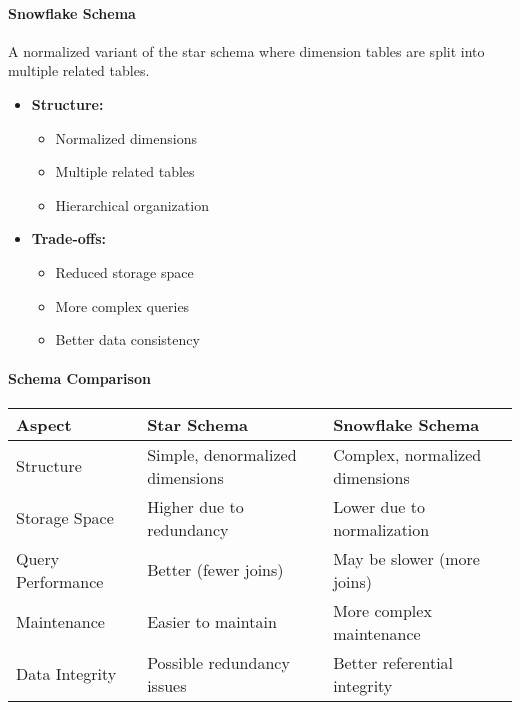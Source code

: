 \documentclass[a4paper,11pt]{article}
\newcommand{\definition}[1]{
  \begin{tcolorbox}[colback=blue!5,colframe=blue!40!black,title=Definition]
    #1
  \end{tcolorbox}
}
\begin{document}
\paragraph{Snowflake Schema}
\bigskip

\definition{
A normalized variant of the star schema where dimension tables are split into multiple related tables.
}

\begin{itemize}
    \item \textbf{Structure:}
        \begin{itemize}
            \item Normalized dimensions
            \item Multiple related tables
            \item Hierarchical organization
        \end{itemize}
    \item \textbf{Trade-offs:}
        \begin{itemize}
            \item Reduced storage space
            \item More complex queries
            \item Better data consistency
        \end{itemize}
\end{itemize}

\paragraph{Schema Comparison}
\begin{center}
\begin{tabular}{|p{3cm}|p{5.5cm}|p{5.5cm}|}
    \hline
    \textbf{Aspect} & \textbf{Star Schema} & \textbf{Snowflake Schema} \\
    \hline
    Structure & Simple, denormalized dimensions & Complex, normalized dimensions \\
    \hline
    Storage Space & Higher due to redundancy & Lower due to normalization \\
    \hline
    Query Performance & Better (fewer joins) & May be slower (more joins) \\
    \hline
    Maintenance & Easier to maintain & More complex maintenance \\
    \hline
    Data Integrity & Possible redundancy issues & Better referential integrity \\
    \hline
\end{tabular}
\end{center}
\end{document}
